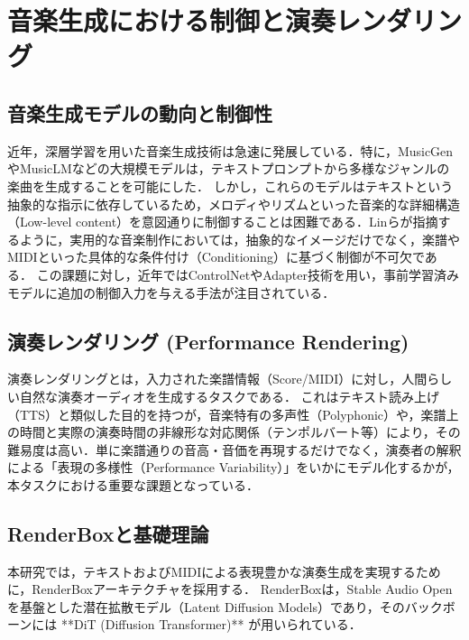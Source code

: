 \section{音楽生成における制御と演奏レンダリング}
\label{sec:related_work}

\subsection{音楽生成モデルの動向と制御性}
\label{subsec:trends}
近年，深層学習を用いた音楽生成技術は急速に発展している．特に，MusicGen\cite{MusicGen}やMusicLM\cite{MusicLM}などの大規模モデルは，テキストプロンプトから多様なジャンルの楽曲を生成することを可能にした．
しかし，これらのモデルはテキストという抽象的な指示に依存しているため，メロディやリズムといった音楽的な詳細構造（Low-level content）を意図通りに制御することは困難である．Linら\cite{Lin2024}が指摘するように，実用的な音楽制作においては，抽象的なイメージだけでなく，楽譜やMIDIといった具体的な条件付け（Conditioning）に基づく制御が不可欠である．
この課題に対し，近年ではControlNet\cite{ControlNet}やAdapter技術を用い，事前学習済みモデルに追加の制御入力を与える手法が注目されている．

\subsection{演奏レンダリング (Performance Rendering)}
\label{subsec:performance_rendering}
演奏レンダリングとは，入力された楽譜情報（Score/MIDI）に対し，人間らしい自然な演奏オーディオを生成するタスクである．
これはテキスト読み上げ（TTS）と類似した目的を持つが，音楽特有の多声性（Polyphonic）や，楽譜上の時間と実際の演奏時間の非線形な対応関係（テンポルバート等）により，その難易度は高い．単に楽譜通りの音高・音価を再現するだけでなく，演奏者の解釈による「表現の多様性（Performance Variability）」をいかにモデル化するかが，本タスクにおける重要な課題となっている．

\subsection{RenderBoxと基礎理論}
\label{subsec:RenderBox}
本研究では，テキストおよびMIDIによる表現豊かな演奏生成を実現するために，RenderBox\cite{RenderBox}アーキテクチャを採用する．
RenderBoxは，Stable Audio Open\cite{stable-audio-open}を基盤とした潜在拡散モデル（Latent Diffusion Models）であり，そのバックボーンには **DiT (Diffusion Transformer)**\cite{DiT-base} が用いられている．

